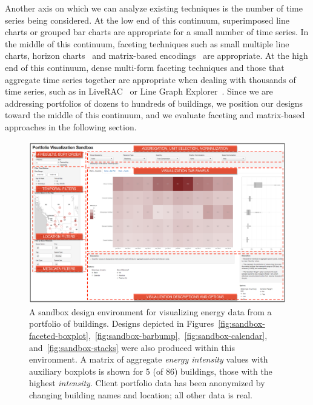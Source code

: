 \documentclass[journal]{vgtc}                %
\begin{document}
Another axis on which we can analyze existing techniques is the number of time series being considered.
At the low end of this continuum, superimposed line charts or grouped bar charts are appropriate for a small number of time series. 
In the middle of this continuum, faceting techniques such as small multiple line charts, horizon charts~\cite{Heer2009} and matrix-based encodings~\cite{Hao2007,Shimabukuro2004} are appropriate.
At the high end of this continuum, dense multi-form faceting techniques and those that aggregate time series together are appropriate when dealing with thousands of time series, such as in LiveRAC~\cite{McLachlan2008} or Line Graph Explorer~\cite{Lam2007}. 
Since we are addressing portfolios of dozens to hundreds of buildings, we position our designs toward the middle of this continuum, and we evaluate faceting and matrix-based approaches in the following section.

\begin{figure}[ht]
	\centering
	\includegraphics[width=\textwidth]{figures/sandbox.pdf}
	\vspace{-0.6cm}
	\caption{A sandbox design environment for visualizing energy data from a portfolio of buildings. Designs depicted in Figures~\ref{fig:sandbox-faceted-boxplot},~\ref{fig:sandbox-barbump},~\ref{fig:sandbox-calendar}, and~\ref{fig:sandbox-stacks} were also produced within this environment. A matrix of aggregate \textsl{energy intensity} values with auxiliary boxplots is shown for 5 (of 86) buildings, those with the highest \textsl{intensity}.
	Client portfolio data has been anonymized by changing building names and location; all other data is real.}
	\label{fig:sandbox}
	\vspace{-0.45cm}
\end{figure} 
\end{document}
